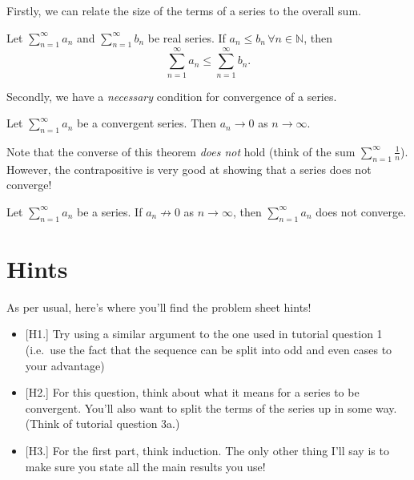\documentclass[
  12pt,
  a4paper]{extarticle}
\providecommand{\tightlist}{%
  \setlength{\itemsep}{0pt}\setlength{\parskip}{0pt}}
\theoremstyle{plain}
\theoremstyle{plain}
\theoremstyle{plain}
\theoremstyle{plain}
\theoremstyle{plain}
\theoremstyle{definition}
\theoremstyle{definition}
\theoremstyle{definition}
\theoremstyle{remark}
\let\BeginKnitrBlock\begin \let\EndKnitrBlock\end
\renewcommand{\;}{\,}
\begin{document}
Firstly, we can relate the size of the terms of a series to the overall sum.

\BeginKnitrBlock{proposition}
{\label{prp:prop1} }Let \(\sum_{n=1}^{\infty} a_n\) and \(\sum_{n=1}^{\infty} b_n\) be real series. If \(a_n \leq b_n \, \forall n\in\mathbb{N}\), then \[\sum_{n=1}^{\infty} a_n \leq \sum_{n=1}^{\infty} b_n.\]
\EndKnitrBlock{proposition}

Secondly, we have a \emph{necessary} condition for convergence of a series.

\BeginKnitrBlock{proposition}
{\label{prp:prop2} }Let \(\sum_{n=1}^{\infty} a_n\) be a convergent series. Then \(a_n \to 0\) as \(n \to \infty\).
\EndKnitrBlock{proposition}
Note that the converse of this theorem \emph{does not} hold (think of the sum \(\sum_{n=1}^{\infty} \frac{1}{n}\)). However, the contrapositive is very good at showing that a series does not converge!

\BeginKnitrBlock{proposition}
{\label{prp:prop3} }Let \(\sum_{n=1}^{\infty} a_n\) be a series. If \(a_n \not\to 0\) as \(n \to \infty\), then \(\sum_{n=1}^{\infty} a_n\) does not converge.
\EndKnitrBlock{proposition}

\hypertarget{hints}{%
\section{Hints}\label{hints}}

As per usual, here's where you'll find the problem sheet hints!

\begin{itemize}
\tightlist
\item
  {[}H1.{]} Try using a similar argument to the one used in tutorial question 1 (i.e.~use the fact that the sequence can be split into odd and even cases to your advantage)
\item
  {[}H2.{]} For this question, think about what it means for a series to be convergent. You'll also want to split the terms of the series up in some way. (Think of tutorial question 3a.)
\item
  {[}H3.{]} For the first part, think induction. The only other thing I'll say is to make sure you state all the main results you use!
\end{itemize}
\end{document}
